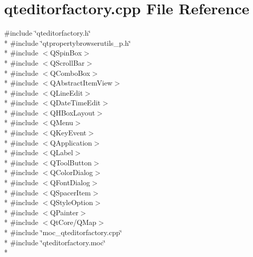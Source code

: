 \section{qteditorfactory.\+cpp File Reference}
\label{qteditorfactory_8cpp}
{\ttfamily \#include \char`\"{}qteditorfactory.\+h\char`\"{}}\\*
{\ttfamily \#include \char`\"{}qtpropertybrowserutils\+\_\+p.\+h\char`\"{}}\\*
{\ttfamily \#include $<$Q\+Spin\+Box$>$}\\*
{\ttfamily \#include $<$Q\+Scroll\+Bar$>$}\\*
{\ttfamily \#include $<$Q\+Combo\+Box$>$}\\*
{\ttfamily \#include $<$Q\+Abstract\+Item\+View$>$}\\*
{\ttfamily \#include $<$Q\+Line\+Edit$>$}\\*
{\ttfamily \#include $<$Q\+Date\+Time\+Edit$>$}\\*
{\ttfamily \#include $<$Q\+H\+Box\+Layout$>$}\\*
{\ttfamily \#include $<$Q\+Menu$>$}\\*
{\ttfamily \#include $<$Q\+Key\+Event$>$}\\*
{\ttfamily \#include $<$Q\+Application$>$}\\*
{\ttfamily \#include $<$Q\+Label$>$}\\*
{\ttfamily \#include $<$Q\+Tool\+Button$>$}\\*
{\ttfamily \#include $<$Q\+Color\+Dialog$>$}\\*
{\ttfamily \#include $<$Q\+Font\+Dialog$>$}\\*
{\ttfamily \#include $<$Q\+Spacer\+Item$>$}\\*
{\ttfamily \#include $<$Q\+Style\+Option$>$}\\*
{\ttfamily \#include $<$Q\+Painter$>$}\\*
{\ttfamily \#include $<$Qt\+Core/\+Q\+Map$>$}\\*
{\ttfamily \#include \char`\"{}moc\+\_\+qteditorfactory.\+cpp\char`\"{}}\\*
{\ttfamily \#include \char`\"{}qteditorfactory.\+moc\char`\"{}}\\*
